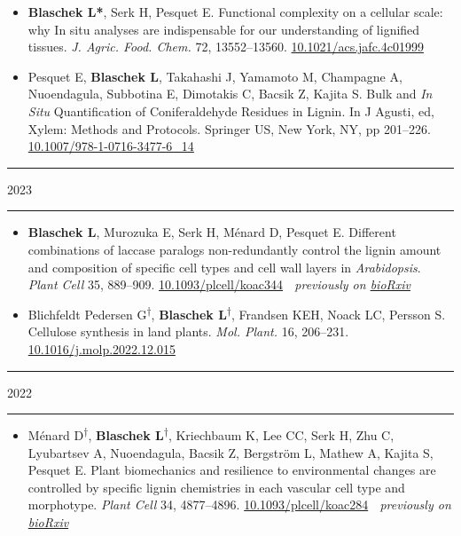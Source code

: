 \documentclass[11pt]{article}
\newcommand*{\xdash}[1][3em]{\rule[0.5ex]{#1}{0.55pt}}
\begin{document}
\vspace{-0.175cm}	
\begin{itemize}[label={},itemindent=-9pt,leftmargin=24pt]
	\itemsep-0.1cm
	\item \textbf{Blaschek L*}, Serk H, Pesquet E. Functional complexity on a cellular scale: why In situ analyses are indispensable for our understanding of lignified tissues. \textit{J. Agric. Food. Chem.} 72, 13552--13560. \href{https://doi.org/10.1021/acs.jafc.4c01999}{10.1021/acs.jafc.4c01999}
	\item Pesquet E, \textbf{Blaschek L}, Takahashi J,	Yamamoto M, Champagne A, Nuoendagula, Subbotina E, Dimotakis C, Bacsik Z, Kajita S. Bulk and \textit{In Situ} Quantification of Coniferaldehyde Residues in Lignin. In J Agusti, ed, Xylem: Methods and Protocols. Springer US, New York, NY, pp 201–226. \href{https://doi.org/10.1007/978-1-0716-3477-6_14}{10.1007/978-1-0716-3477-6\_14}
\end{itemize}

\hspace*{\fill} \xdash[6em] \large{\textsc{2023}} \xdash[6em] \hspace*{\fill} \normalsize

\vspace{-0.175cm}	
\begin{itemize}[label={},itemindent=-9pt,leftmargin=24pt]
	\itemsep-0.1cm
	\item \textbf{Blaschek L}, Murozuka E, Serk H, Ménard D, Pesquet E. Different combinations of laccase paralogs non-redundantly control the lignin amount and composition of specific cell types and cell wall layers in \textit{Arabidopsis}. \textit{Plant Cell} 35, 889–909. \href{https://doi.org/10.1093/plcell/koac344}{10.1093/plcell/koac344} \textemdash $\;$ \textit{previously on \href{https://doi.org/10.1101/2022.05.04.490011}{bioRxiv}}
	\item Blichfeldt Pedersen G\textsuperscript{$\dagger$}, \textbf{Blaschek L}\textsuperscript{$\dagger$}, Frandsen KEH, Noack LC, Persson S. Cellulose synthesis in land plants. \textit{Mol. Plant.} 16, 206–231. \href{https://doi.org/10.1016/j.molp.2022.12.015}{10.1016/j.molp.2022.12.015}
\end{itemize}

\hspace*{\fill} \xdash[6em] \large{\textsc{2022}} \xdash[6em] \hspace*{\fill} \normalsize

\vspace{-0.175cm}	
\begin{itemize}[label={},itemindent=-9pt,leftmargin=24pt]
	\itemsep-0.1cm
	\item Ménard D\textsuperscript{$\dagger$}, \textbf{Blaschek L}\textsuperscript{$\dagger$}, Kriechbaum K, Lee CC, Serk H, Zhu C, Lyubartsev A, Nuoendagula, Bacsik Z, Bergström L, Mathew A, Kajita S, Pesquet E. Plant biomechanics and resilience to environmental changes are controlled by specific lignin chemistries in each vascular cell type and morphotype. \textit{Plant Cell} 34, 4877–4896. \href{https://doi.org/10.1093/plcell/koac284}{10.1093/plcell/koac284} \textemdash $\;$ \textit{previously on \href{https://doi.org/10.1101/2021.06.12.447240}{bioRxiv}}
\end{itemize}
\end{document}
